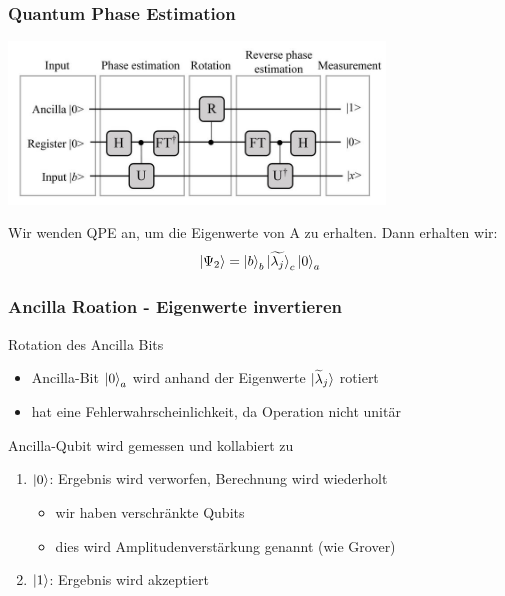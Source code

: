 \begin{frame}
    \frametitle{Quantum Phase Estimation}
    \begin{center}
    \includegraphics[width=10cm]{img/hhl_circuit.jpg}
    \end{center}

    Wir wenden QPE an, um die Eigenwerte von A zu erhalten.
    Dann erhalten wir:
    $$\ket{\Psi_2} = \ket{b}_b \ket{\widetilde{\lambda_j}}_c\ket{0}_a$$


\end{frame}


\begin{frame}
    \frametitle{Ancilla Roation - Eigenwerte invertieren}

    Rotation des Ancilla Bits
    \begin{itemize}
        \item Ancilla-Bit $\ket{0}_a$ wird anhand der Eigenwerte $\ket{ \widetilde{\lambda}_j}$ rotiert
        \item hat eine Fehlerwahrscheinlichkeit, da Operation nicht unitär 
    \end{itemize}

    \hfil

    Ancilla-Qubit wird gemessen und kollabiert zu
    \begin{enumerate}
        \item $\ket{0}$: Ergebnis wird verworfen, Berechnung wird wiederholt
            \begin{itemize}
            \item wir haben verschränkte Qubits
            \item dies wird Amplitudenverstärkung genannt (wie Grover)
            \end{itemize}
        \item $\ket{1}$: Ergebnis wird akzeptiert
    \end{enumerate}

\end{frame}

